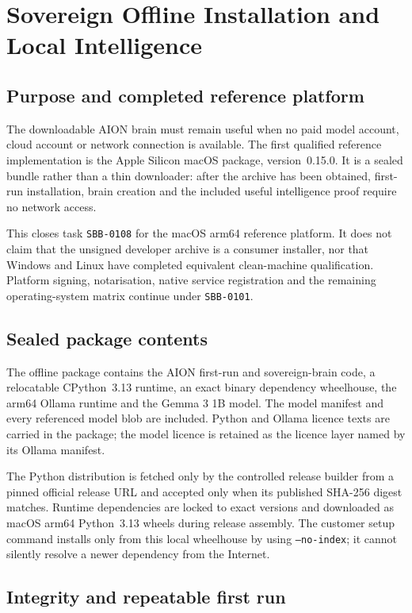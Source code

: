 \section{Sovereign Offline Installation and Local Intelligence}

\subsection{Purpose and completed reference platform}

The downloadable AION brain must remain useful when no paid model account, cloud account or
network connection is available. The first qualified reference implementation is the Apple
Silicon macOS package, version~0.15.0. It is a sealed bundle rather than a thin downloader: after
the archive has been obtained, first-run installation, brain creation and the included useful
intelligence proof require no network access.

This closes task \texttt{SBB-0108} for the macOS arm64 reference platform. It does not claim that
the unsigned developer archive is a consumer installer, nor that Windows and Linux have completed
equivalent clean-machine qualification. Platform signing, notarisation, native service
registration and the remaining operating-system matrix continue under \texttt{SBB-0101}.

\subsection{Sealed package contents}

The offline package contains the AION first-run and sovereign-brain code, a relocatable
CPython~3.13 runtime, an exact binary dependency wheelhouse, the arm64 Ollama runtime and the Gemma
3 1B model. The model manifest and every referenced model blob are included. Python and Ollama
licence texts are carried in the package; the model licence is retained as the licence layer named
by its Ollama manifest.

The Python distribution is fetched only by the controlled release builder from a pinned official
release URL and accepted only when its published SHA-256 digest matches. Runtime dependencies are
locked to exact versions and downloaded as macOS arm64 Python~3.13 wheels during release assembly.
The customer setup command installs only from this local wheelhouse by using
\texttt{--no-index}; it cannot silently resolve a newer dependency from the Internet.

\subsection{Integrity and repeatable first run}

